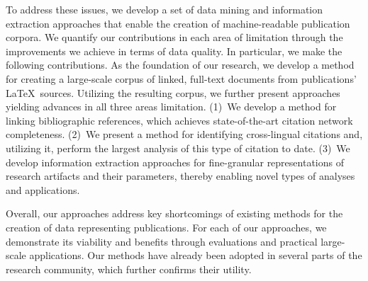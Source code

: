 To address these issues, we develop a set of data mining and information extraction approaches that enable the creation of machine-readable publication corpora.
We quantify our contributions in each area of limitation through the improvements we achieve in terms of data quality.
%
In particular, we make the following contributions.
As the foundation of our research, we develop a method for creating a large-scale corpus of linked, full-text documents from publications' \LaTeX\ sources.
Utilizing the resulting corpus, we further present approaches yielding advances in all three areas limitation.
(1)~We develop a method for linking bibliographic references, which achieves state-of-the-art citation network completeness.
(2)~We present a method for identifying cross-lingual citations and, utilizing it, perform the largest analysis of this type of citation to date.
(3)~We develop information extraction approaches for fine-granular representations of research artifacts and their parameters, thereby enabling novel types of analyses and applications.


Overall, our approaches address key shortcomings of existing methods for the creation of data representing publications.
For each of our approaches, we demonstrate its viability and benefits through evaluations and practical large-scale applications.
Our methods have already been adopted in several parts of the research community, which further confirms their utility.
